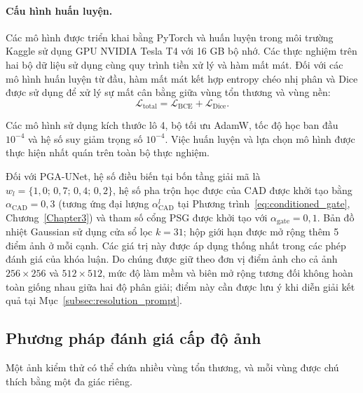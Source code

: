 \paragraph{Cấu hình huấn luyện.}
Các mô hình được triển khai bằng PyTorch và huấn luyện trong môi trường Kaggle sử dụng GPU NVIDIA Tesla T4 với 16 GB bộ nhớ. Các thực nghiệm trên hai bộ dữ liệu sử dụng cùng quy trình tiền xử lý và hàm mất mát. Đối với các mô hình huấn luyện từ đầu, hàm mất mát kết hợp entropy chéo nhị phân và Dice được sử dụng để xử lý sự mất cân bằng giữa vùng tổn thương và vùng nền:
\begin{equation}
    \mathcal{L}_{\mathrm{total}}
    = \mathcal{L}_{\mathrm{BCE}}
    + \mathcal{L}_{\mathrm{Dice}}.
    \label{eq:loss_seg}
\end{equation}

Các mô hình sử dụng kích thước lô 4, bộ tối ưu AdamW, tốc độ học ban đầu $10^{-4}$ và hệ số suy giảm trọng số $10^{-4}$. Việc huấn luyện và lựa chọn mô hình được thực hiện nhất quán trên toàn bộ thực nghiệm.

Đối với PGA-UNet, hệ số điều biến tại bốn tầng giải mã là $w_l=\{1{,}0;\,0{,}7;\,0{,}4;\,0{,}2\}$, hệ số pha trộn học được của CAD được khởi tạo bằng $\alpha_{\mathrm{CAD}}=0{,}3$ (tương ứng đại lượng $\alpha^{l}_{\mathrm{CAD}}$ tại Phương trình~\eqref{eq:conditioned_gate}, Chương~\ref{Chapter3}) và tham số cổng PSG được khởi tạo với $\alpha_{\mathrm{gate}}=0{,}1$. Bản đồ nhiệt Gaussian sử dụng cửa sổ lọc $k=31$; hộp giới hạn được mở rộng thêm 5 điểm ảnh ở mỗi cạnh. Các giá trị này được áp dụng thống nhất trong các phép đánh giá của khóa luận. Do chúng được giữ theo đơn vị điểm ảnh cho cả ảnh $256\times256$ và $512\times512$, mức độ làm mềm và biên mở rộng tương đối không hoàn toàn giống nhau giữa hai độ phân giải; điểm này cần được lưu ý khi diễn giải kết quả tại Mục~\ref{subsec:resolution_prompt}.
\subsection{Phương pháp đánh giá cấp độ ảnh}
\label{subsec:image_level_eval}

Một ảnh kiểm thử có thể chứa nhiều vùng tổn thương, và mỗi vùng được chú thích bằng một đa giác riêng.

